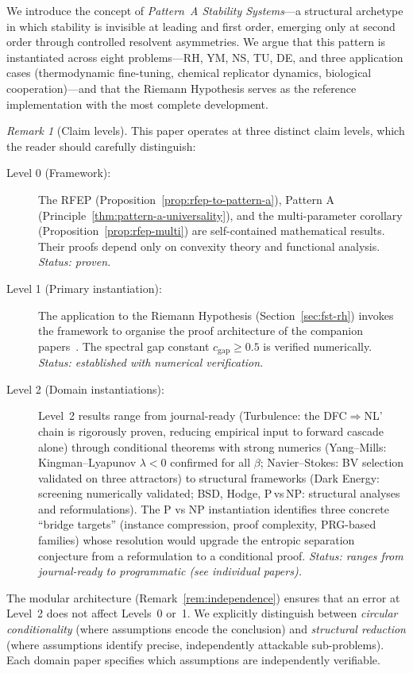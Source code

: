 \documentclass[12pt,a4paper]{article}
\theoremstyle{definition}
\theoremstyle{remark}
\newtheorem{remark}[theorem]{Remark}
\begin{document}
We introduce the concept of \emph{Pattern~A Stability Systems}---a structural archetype in which stability is invisible at leading and first order, emerging only at second order through controlled resolvent asymmetries. We argue that this pattern is instantiated across eight problems---RH, YM, NS, TU, DE, and three application cases (thermodynamic fine-tuning, chemical replicator dynamics, biological cooperation)---and that the Riemann Hypothesis serves as the reference implementation with the most complete development.

\begin{remark}[Claim levels]
\label{rem:claim-levels}
This paper operates at three distinct claim levels, which the reader should carefully distinguish:
\begin{description}
\item[Level 0 (Framework):] The RFEP (Proposition~\ref{prop:rfep-to-pattern-a}), Pattern A (Principle~\ref{thm:pattern-a-universality}), and the multi-parameter corollary (Proposition~\ref{prop:rfep-multi}) are self-contained mathematical results. Their proofs depend only on convexity theory and functional analysis. \emph{Status: proven.}
\item[Level 1 (Primary instantiation):] The application to the Riemann Hypothesis (Section~\ref{sec:fst-rh}) invokes the framework to organise the proof architecture of the companion papers~\cite{Geiger2026a,Geiger2026b,Geiger2026c}. The spectral gap constant $c_{\mathrm{gap}} \geq 0.5$ is verified numerically. \emph{Status: established with numerical verification.}
\item[Level 2 (Domain instantiations):] Level~2 results range from journal-ready (Turbulence: the DFC$\Rightarrow$NL' chain is rigorously proven, reducing empirical input to forward cascade alone) through conditional theorems with strong numerics (Yang--Mills: Kingman--Lyapunov $\lambda < 0$ confirmed for all $\beta$; Navier--Stokes: BV selection validated on three attractors) to structural frameworks (Dark Energy: screening numerically validated; BSD, Hodge, P\,vs\,NP: structural analyses and reformulations). The P vs NP instantiation identifies three concrete ``bridge targets'' (instance compression, proof complexity, PRG-based families) whose resolution would upgrade the entropic separation conjecture from a reformulation to a conditional proof. \emph{Status: ranges from journal-ready to programmatic (see individual papers).}
\end{description}
The modular architecture (Remark~\ref{rem:independence}) ensures that an error at Level~2 does not affect Levels~0 or~1.
We explicitly distinguish between \emph{circular conditionality} (where assumptions encode the conclusion) and \emph{structural reduction} (where assumptions identify precise, independently attackable sub-problems). Each domain paper specifies which assumptions are independently verifiable.
\end{remark}
\end{document}

